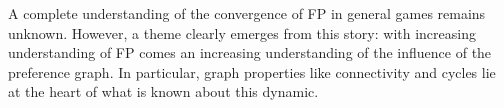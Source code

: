 \documentclass[preprint,authoryear]{elsarticle}
\begin{document}
A complete understanding of the convergence of FP in general games remains unknown. However, a theme clearly emerges from this story: with increasing understanding of FP comes an increasing understanding of the influence of the preference graph. In particular, graph properties like connectivity and cycles lie at the heart of what is known about this dynamic.




\end{document}
